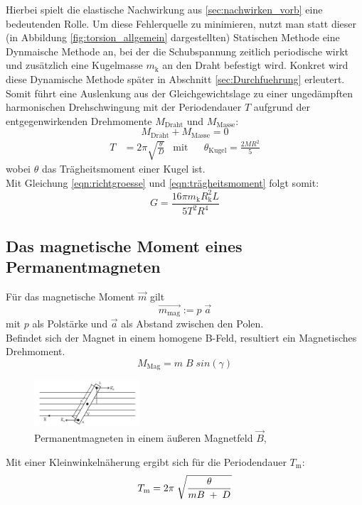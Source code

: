 Hierbei spielt die elastische Nachwirkung aus \ref{sec:nachwirken_vorb} eine bedeutenden Rolle.
Um diese Fehlerquelle zu minimieren, nutzt man statt dieser (in Abbildung \ref{fig:torsion_allgemein} dargestellten) 
Statischen Methode eine Dynmaische
Methode an, bei der die Schubspannung zeitlich periodische wirkt und zusätzlich eine Kugelmasse $m_\text{k}$ 
an den Draht befestigt wird.
Konkret wird diese Dynamische Methode später in Abschnitt \ref{sec:Durchfuehrung} erleutert.\\
\newpage
Somit führt eine Auslenkung aus der Gleichgewichtslage zu einer ungedämpften harmonischen
Drehschwingung mit der Periodendauer $T$ aufgrund der entgegenwirkenden Drehmomente $M_\text{Draht}$ 
und $M_\text{Masse}$:
\begin{equation}
    M_\text{Draht} + M_\text{Masse} = 0
\end{equation}
\begin{align}
    T & = 2\pi \sqrt{\frac{\theta}{D}} & \mathrm{mit} & &  \theta_\text{Kugel} = \frac{2MR^2}{5}
    \label{eqn:trägheitsmoment}
\end{align}
wobei $\theta$ das Trägheitsmoment einer Kugel ist.\\

Mit Gleichung \ref{eqn:richtgroesse} und \ref{eqn:trägheitsmoment} folgt somit:
\begin{equation}
    G=\frac{16 \pi m_\text{k}R^2_\text{k}L}{5T^2R^4}
    \label{eqn:schubmodul_formel}
\end{equation}


\subsection{Das magnetische Moment eines Permanentmagneten}
Für das magnetische Moment $\vec{m}$ gilt
\begin{equation}
    \vec{m_\text{mag}}:=p\;\vec{a}
\end{equation}
mit $p$ als Polstärke und $\vec{a}$ als Abstand zwischen den Polen.\\
Befindet sich der Magnet in einem homogene B-Feld, resultiert ein Magnetisches Drehmoment.
\begin{equation}
    M_\text{Mag} = m\;B\;sin(\gamma)
\end{equation}

\begin{figure}[h]
    \centering
    \includegraphics[width=0.35\textwidth, height=0.15\textwidth]{bilder/Drehmoment.jpg}
    \caption{Permanentmagneten in einem äußeren Magnetfeld $\vec{B}$,\cite[12]{Anleitung}}        
    \label{fig:drehmoment}
\end{figure}

Mit einer Kleinwinkelnäherung ergibt sich für die Periodendauer $T_\text{m}$:
\begin{equation}
    T_\text{m} = 2\pi\;\sqrt{\frac{\theta}{mB\;+\;D}}\\
    \label{eqn:periode}
\end{equation}

